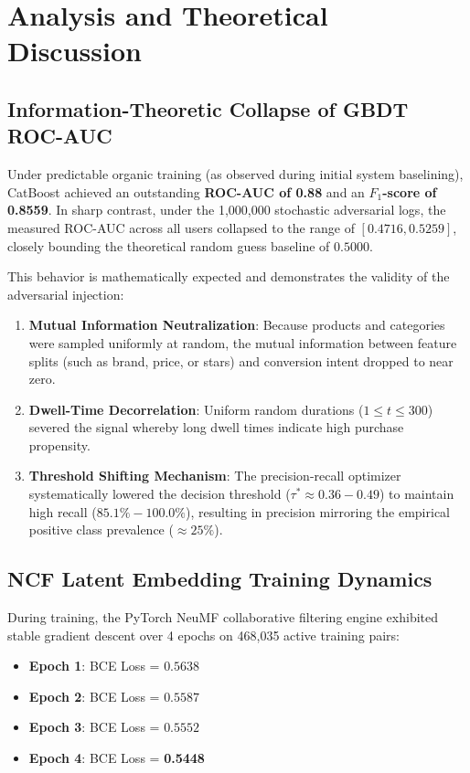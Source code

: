\documentclass[11pt,a4paper]{article}
\begin{document}
\section{Analysis and Theoretical Discussion}

\subsection{Information-Theoretic Collapse of GBDT ROC-AUC}
Under predictable organic training (as observed during initial system baselining), CatBoost achieved an outstanding \textbf{ROC-AUC of 0.88} and an \textbf{$F_1$-score of 0.8559}. In sharp contrast, under the 1,000,000 stochastic adversarial logs, the measured ROC-AUC across all users collapsed to the range of $[0.4716, 0.5259]$, closely bounding the theoretical random guess baseline of $0.5000$.

This behavior is mathematically expected and demonstrates the validity of the adversarial injection:
\begin{enumerate}
    \item \textbf{Mutual Information Neutralization}: Because products and categories were sampled uniformly at random, the mutual information between feature splits (such as brand, price, or stars) and conversion intent dropped to near zero.
    \item \textbf{Dwell-Time Decorrelation}: Uniform random durations ($1 \le t \le 300$) severed the signal whereby long dwell times indicate high purchase propensity.
    \item \textbf{Threshold Shifting Mechanism}: The precision-recall optimizer systematically lowered the decision threshold ($\tau^* \approx 0.36 - 0.49$) to maintain high recall ($85.1\% - 100.0\%$), resulting in precision mirroring the empirical positive class prevalence ($\approx 25\%$).
\end{enumerate}

\subsection{NCF Latent Embedding Training Dynamics}
During training, the PyTorch NeuMF collaborative filtering engine exhibited stable gradient descent over 4 epochs on 468,035 active training pairs:
\begin{itemize}
    \item \textbf{Epoch 1}: BCE Loss = $0.5638$
    \item \textbf{Epoch 2}: BCE Loss = $0.5587$
    \item \textbf{Epoch 3}: BCE Loss = $0.5552$
    \item \textbf{Epoch 4}: BCE Loss = \textbf{0.5448}
\end{itemize}
\end{document}
